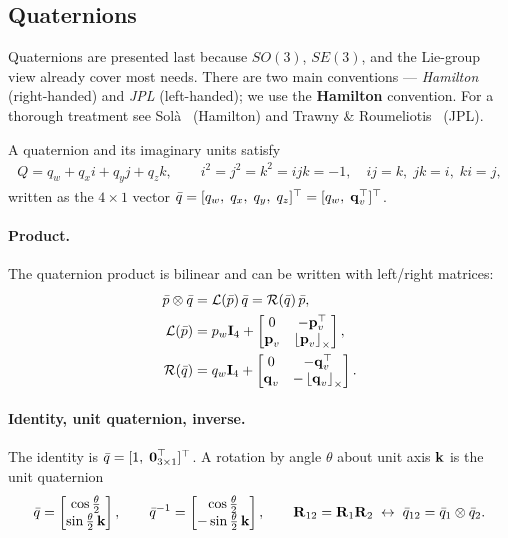 \subsection{Quaternions}
Quaternions are presented last because $SO(3)$, $SE(3)$, and the Lie-group view already cover most needs. There are two main conventions --- \emph{Hamilton} (right-handed) and \emph{JPL} (left-handed); we use the \textbf{Hamilton} convention. For a thorough treatment see Sol\`a~\cite{Sola2017Quaternion} (Hamilton) and Trawny \& Roumeliotis~\cite{Trawny2005Quaternion} (JPL).

A quaternion and its imaginary units satisfy
\begin{align}
Q = q_w + q_x i + q_y j + q_z k, \qquad i^2 = j^2 = k^2 = ijk = -1, \quad ij = k,\; jk = i,\; ki = j,
\end{align}
written as the $4\times1$ vector $\bar{q} = [q_w,\;q_x,\;q_y,\;q_z]^\top = [q_w,\;\boldsymbol{\mathbf{q}}_v^\top]^\top$.

\paragraph{Product.} The quaternion product is bilinear and can be written with left/right matrices:
\begin{align}
\bar{p}\otimes\bar{q} &= \mathcal{L}(\bar{p})\,\bar{q} = \mathcal{R}(\bar{q})\,\bar{p}, \\
\mathcal{L}(\bar{p}) &= p_w\boldsymbol{\mathbf{I}}_4 + \begin{bmatrix} 0 & -\boldsymbol{\mathbf{p}}_v^\top \\ \boldsymbol{\mathbf{p}}_v & \left\lfloor\boldsymbol{\mathbf{p}}_v\right\rfloor_{\times} \end{bmatrix}, \\
\mathcal{R}(\bar{q}) &= q_w\boldsymbol{\mathbf{I}}_4 + \begin{bmatrix} 0 & -\boldsymbol{\mathbf{q}}_v^\top \\ \boldsymbol{\mathbf{q}}_v & -\left\lfloor\boldsymbol{\mathbf{q}}_v\right\rfloor_{\times} \end{bmatrix}.
\end{align}

\paragraph{Identity, unit quaternion, inverse.} The identity is $\bar{q} = [1,\;\boldsymbol{\mathbf{0}}_{3\times1}^\top]^\top$. A rotation by angle $\theta$ about unit axis $\boldsymbol{\mathbf{k}}$ is the unit quaternion
\begin{align}
\bar{q} = \begin{bmatrix}\cos\tfrac{\theta}{2}\\ \sin\tfrac{\theta}{2}\,\boldsymbol{\mathbf{k}}\end{bmatrix}, \qquad
\bar{q}^{-1} = \begin{bmatrix}\cos\tfrac{\theta}{2}\\ -\sin\tfrac{\theta}{2}\,\boldsymbol{\mathbf{k}}\end{bmatrix}, \qquad
\boldsymbol{\mathbf{R}}_{12} = \boldsymbol{\mathbf{R}}_1\boldsymbol{\mathbf{R}}_2 \;\leftrightarrow\; \bar{q}_{12} = \bar{q}_1\otimes\bar{q}_2.
\end{align}

